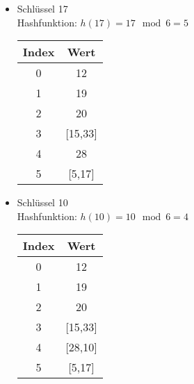 \begin{multicols}{2}
\begin{itemize}
\item Schlüssel 17\\
Hashfunktion: $h(17) = 17 \mod 6 = 5$

\begin{center}
\begin{tabular}{c|c}
Index & Wert \\
\hline
0 & 12\\
1 & 19\\
2 & 20\\
3 & [15,33]\\
4 & 28\\
5 & [5,17]\\
\end{tabular}
\end{center}

\columnbreak
\item Schlüssel 10\\
Hashfunktion: $h(10) = 10 \mod 6 = 4$

\begin{center}
\begin{tabular}{c|c}
Index & Wert \\
\hline
0 & 12\\
1 & 19\\
2 & 20\\
3 & [15,33]\\
4 & [28,10]\\
5 & [5,17]\\
\end{tabular}
\end{center}
\end{itemize}
\end{multicols}